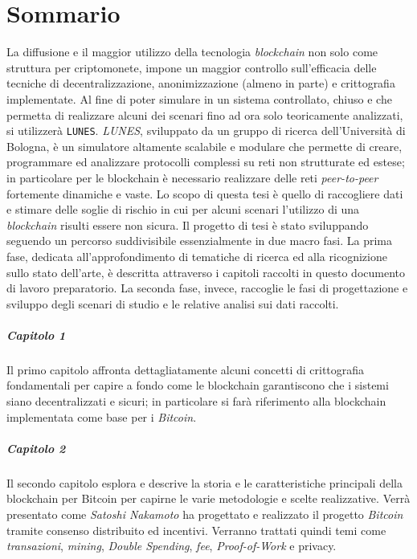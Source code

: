 \chapter*{Sommario}
La diffusione e il maggior utilizzo della tecnologia \textit{blockchain} non solo come struttura per criptomonete, impone un maggior controllo sull'efficacia delle tecniche di decentralizzazione, anonimizzazione (almeno in parte) e crittografia implementate.\newline
Al fine di poter simulare in un sistema controllato, chiuso e che permetta di realizzare alcuni dei scenari fino ad ora solo teoricamente analizzati, si utilizzerà \texttt{LUNES}\cite{gdalunes}.\newline
\textit{LUNES}, sviluppato da un gruppo di ricerca dell'Università di Bologna, è un simulatore altamente scalabile e modulare che permette di creare, programmare ed analizzare protocolli complessi su reti non strutturate ed estese; in particolare per le blockchain è necessario realizzare delle reti \textit{peer-to-peer} fortemente dinamiche e vaste.\newline
Lo scopo di questa tesi è quello di raccogliere dati e stimare delle soglie di rischio in cui per alcuni scenari l'utilizzo di una \textit{blockchain} risulti essere non sicura.\newline\newline
Il progetto di tesi è stato sviluppando seguendo un percorso suddivisibile essenzialmente in due macro fasi. La prima fase, dedicata all'approfondimento di tematiche di ricerca ed alla ricognizione sullo stato dell'arte, è descritta attraverso i capitoli raccolti in questo documento di lavoro preparatorio. La seconda fase, invece, raccoglie le fasi di progettazione e sviluppo degli scenari di studio e le relative analisi sui dati raccolti.\newline

\paragraph{Capitolo 1}
Il primo capitolo affronta dettagliatamente alcuni concetti di crittografia fondamentali per capire a fondo come le blockchain garantiscono che i sistemi siano decentralizzati e sicuri; in particolare si farà riferimento alla blockchain implementata come base per i \textit{Bitcoin}.

\paragraph{Capitolo 2}
Il secondo capitolo esplora e descrive la storia e le caratteristiche principali della blockchain per Bitcoin per capirne le varie metodologie e scelte realizzative. Verrà presentato come \textit{Satoshi Nakamoto} ha progettato e realizzato il progetto \textit{Bitcoin} tramite consenso distribuito ed incentivi. Verranno trattati quindi temi come \textit{transazioni}, \textit{mining}, \textit{Double Spending}, \textit{fee}, \textit{Proof-of-Work} e privacy.

